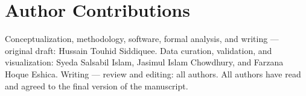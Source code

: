 \documentclass[11pt,a4paper]{article}
\begin{document}
\section*{Author Contributions}
Conceptualization, methodology, software, formal analysis, and writing --- original draft: Hussain Touhid Siddiquee. Data curation, validation, and visualization: Syeda Salsabil Islam, Jasimul Islam Chowdhury, and Farzana Hoque Eshica. Writing --- review and editing: all authors. All authors have read and agreed to the final version of the manuscript.

\end{document}
